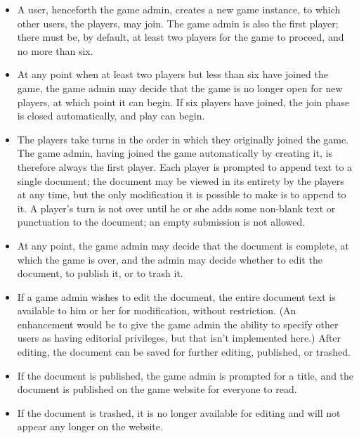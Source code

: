 \documentclass{manual}
\begin{document}
\begin{itemize}

\item A user, henceforth the game admin, creates a new game instance,
to which other users, the players, may join.  The game admin is also
the first player; there must be, by default, at least two players for
the game to proceed, and no more than six.

\item At any point when at least two players but less than six have
joined the game, the game admin may decide that the game is no longer
open for new players, at which point it can begin.  If six players
have joined, the join phase is closed automatically, and play can
begin.

\item The players take turns in the order in which they originally
joined the game.  The game admin, having joined the game automatically
by creating it, is therefore always the first player.  Each player is
prompted to append text to a single document; the document may be
viewed in its entirety by the players at any time, but the only
modification it is possible to make is to append to it.  A player's
turn is not over until he or she adds some non-blank text or punctuation
to the document; an empty submission is not allowed.

\item At any point, the game admin may decide that the document is
complete, at which the game is over, and the admin may decide whether
to edit the document, to publish it, or to trash it.  

\item If a game admin wishes to edit the document, the entire document
text is available to him or her for modification, without restriction.
(An enhancement would be to give the game admin the ability to specify
other users as having editorial privileges, but that isn't implemented
here.)  After editing, the document can be saved for further editing,
published, or trashed.

\item If the document is published, the game admin is prompted for a
title, and the document is published on the game website for everyone
to read.

\item If the document is trashed, it is no longer available for
editing and will not appear any longer on the website.

\end{itemize}
\end{document}

